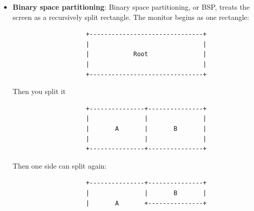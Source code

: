 \documentclass{report}
\begin{document}
\begin{itemize}
                \begin{align*}
                    \text{cols} &= \left\lceil \sqrt{n} \right\rceil \\
                    \text{rows} &= \left\lceil \frac{n}{\text{cols}} \right\rceil
                .\end{align*}
                Then, for each cell,
                \begin{align*}
                    \text{cell\_w} &= \text{screen\_width} / \text{cols} \\
                    \text{cell\_h} &= \text{screen\_height} / \text{rows}
                .\end{align*}
                A common refinement is to avoid ugly empty cells. For example, with 5 windows:
                \begin{verbatim}
                    +----------+----------+----------+
                    |    A     |    B     |    C     |
                    +----------+----------+----------+
                    |    D     |          E          |
                    +----------+---------------------+
                \end{verbatim}
            \item \textbf{Binary space partitioning}: Binary space partitioning, or BSP, treats the screen as a recursively split rectangle.
                \bigbreak \noindent 
                The monitor begins as one rectangle:
                \begin{verbatim}
                    +-------------------------------+
                    |                               |
                    |            Root               |
                    |                               |
                    +-------------------------------+
                \end{verbatim}
                Then you split it
                \begin{verbatim}
                    +---------------+---------------+
                    |               |               |
                    |       A       |       B       |
                    |               |               |
                    +---------------+---------------+
                \end{verbatim}
                Then one side can split again:
                \begin{verbatim}
                    +---------------+---------------+
                    |               |       B       |
                    |       A       +---------------+

\end{verbatim}
\end{itemize}
\end{document}
